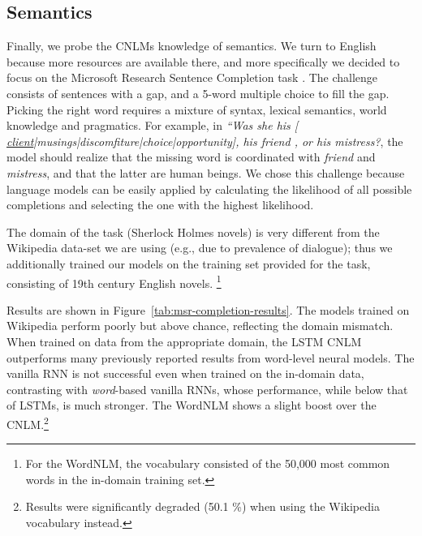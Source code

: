 

\subsection{Semantics}
\label{sec:semantics}

Finally, we probe the CNLMs knowledge of semantics. We turn to English
because more resources are available there, and more specifically we
decided to focus on the Microsoft Research Sentence Completion task
\cite{Zweig:Burges:2011}. The challenge consists of sentences with a
gap, and a 5-word multiple choice to fill the gap. Picking the right
word requires a mixture of syntax, lexical semantics, world knowledge
and pragmatics. For example, in \emph{``Was she his [
  \underline{client}|musings|discomfiture|choice|opportunity], his
  friend , or his mistress?}, the model should realize that the
missing word is coordinated with \emph{friend} and \emph{mistress},
and that the latter are human beings. We chose this challenge because
language models can be easily applied by calculating the likelihood of
all possible completions and selecting the one with the highest
likelihood.

The domain of the task (Sherlock Holmes novels) is very different from
the Wikipedia data-set we are using (e.g., due to prevalence of dialogue); thus we additionally trained our
models on the training set provided for the task, consisting of 19th
century English novels. 
\footnote{For the WordNLM, the vocabulary consisted
of the 50,000 most common words in the in-domain training set.}

Results are shown in Figure~\ref{tab:msr-completion-results}.  The
models trained on Wikipedia perform poorly but above chance,
reflecting the domain mismatch.  When trained on data from the
appropriate domain, the LSTM CNLM outperforms many previously reported
results from word-level neural
models. %
The vanilla RNN is not successful even when trained on the in-domain
data, contrasting with \emph{word}-based vanilla RNNs, whose
performance, while below that of LSTMs, is much stronger.
The WordNLM shows a slight boost over the CNLM.\footnote{Results were significantly degraded (50.1 \%) when using the Wikipedia vocabulary instead.}


